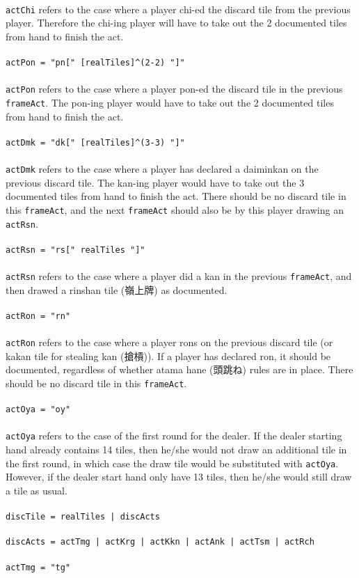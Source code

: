 \documentclass[%
	a4paper%
	,10pt%
	,twoside%
	,notitlepage%
]{article}%
\newcommand*{\ruleSymbol}{\textjapanese{⚠}}%
\newcommand*{\ruleMargin}{\marginpar{\flushright{}\ruleSymbol{}}}%
\newcommand*{\rulePar}{\paragraph*{\ruleMargin{}}}%
\begin{document}
			\paragraph*{}\lstinline/actChi/ refers to the case where a player chi-ed the discard tile from the previous player. Therefore the chi-ing player will have to take out the 2 documented tiles from hand to finish the act. %
			\rulePar{}\lstinline/actPon = "pn[" [realTiles]^(2-2) "]"/%
			\paragraph*{}\lstinline/actPon/ refers to the case where a player pon-ed the discard tile in the previous \lstinline/frameAct/. The pon-ing player would have to take out the 2 documented tiles from hand to finish the act. %
			\rulePar{}\lstinline/actDmk = "dk[" [realTiles]^(3-3) "]"/%
			\paragraph*{}\lstinline/actDmk/ refers to the case where a player has declared a daiminkan on the previous discard tile. The kan-ing player would have to take out the 3 documented tiles from hand to finish the act. There should be no discard tile in this \lstinline/frameAct/, and the next \lstinline/frameAct/ should also be by this player drawing an \lstinline/actRsn/. %
			\rulePar{}\lstinline/actRsn = "rs[" realTiles "]"/%
			\paragraph*{}\lstinline/actRsn/ refers to the case where a player did a kan in the previous \lstinline/frameAct/, and then drawed a rinshan tile (\textjapanese{嶺上牌}) as documented. %
			\rulePar{}\lstinline/actRon = "rn"/%
			\paragraph*{}\lstinline/actRon/ refers to the case where a player rons on the previous discard tile (or kakan tile for stealing kan (\textjapanese{搶槓})). If a player has declared ron, it should be documented, regardless of whether atama hane (\textjapanese{頭跳ね}) rules are in place. There should be no discard tile in this \lstinline/frameAct/. %
			\rulePar{}\lstinline/actOya = "oy"/%
			\paragraph*{}\lstinline/actOya/ refers to the case of the first round for the dealer. If the dealer starting hand already contains 14 tiles, then he/she would not draw an additional tile in the first round, in which case the draw tile would be substituted with \lstinline/actOya/. However, if the dealer start hand only have 13 tiles, then he/she would still draw a tile as usual. %
			\rulePar{}\lstinline/discTile = realTiles | discActs/%
			\rulePar{}\lstinline/discActs = actTmg | actKrg | actKkn | actAnk | actTsm | actRch/%
			\rulePar{}\lstinline/actTmg = "tg"/%
\end{document}
